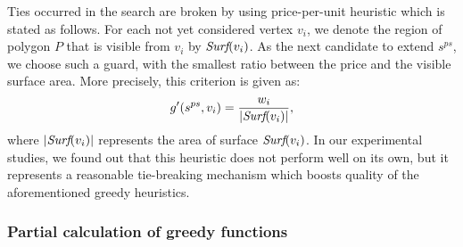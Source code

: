\documentclass[runningheads,a4paper]{elsarticle}
\begin{document}
	
	Ties occurred in the search are broken by using  price-per-unit heuristic which is stated as follows.
	For each not yet considered vertex $v_i$, we denote the region of polygon $P$ that is visible from $v_i$ by $\emph{Surf}(v_i)$. As the next candidate to extend $s^{ps}$, we choose such a guard,  with the smallest ratio between the price and the visible surface area. More precisely, this  criterion is given as:
	\begin{align}
	g'(s^{ps}, v_i) = \frac{w_{i}}{|\emph{Surf}({v_i})|},
	\end{align}
    where $|\emph{Surf}({v_i})|$ represents the area of surface $\emph{Surf}({v_i})$.
	In our experimental studies, we found out that this heuristic does not perform well on its own, but it represents a reasonable tie-breaking mechanism which boosts quality of the aforementioned greedy heuristics.
	\subsubsection{Partial calculation of greedy functions}
	
\end{document}
